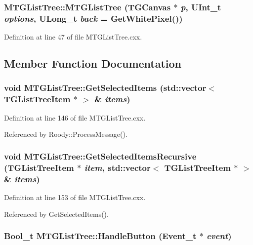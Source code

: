 \subsubsection[{MTGListTree}]{\setlength{\rightskip}{0pt plus 5cm}MTGListTree::MTGListTree (TGCanvas $\ast$ {\em p}, \/  UInt\_\-t {\em options}, \/  ULong\_\-t {\em back} = {\ttfamily GetWhitePixel()})}\label{classMTGListTree_ad0a89f242825cc021a560796533702b4}


Definition at line 47 of file MTGListTree.cxx.

\subsection{Member Function Documentation}
\subsubsection[{GetSelectedItems}]{\setlength{\rightskip}{0pt plus 5cm}void MTGListTree::GetSelectedItems (std::vector$<$ TGListTreeItem $\ast$ $>$ \& {\em items})}\label{classMTGListTree_a959170a63b6fb0a2c17944f6316743ce}


Definition at line 146 of file MTGListTree.cxx.

Referenced by Roody::ProcessMessage().
\subsubsection[{GetSelectedItemsRecursive}]{\setlength{\rightskip}{0pt plus 5cm}void MTGListTree::GetSelectedItemsRecursive (TGListTreeItem $\ast$ {\em item}, \/  std::vector$<$ TGListTreeItem $\ast$ $>$ \& {\em items})}\label{classMTGListTree_ae4574857d80369d1acf9df42ab38d331}


Definition at line 153 of file MTGListTree.cxx.

Referenced by GetSelectedItems().
\subsubsection[{HandleButton}]{\setlength{\rightskip}{0pt plus 5cm}Bool\_\-t MTGListTree::HandleButton (Event\_\-t $\ast$ {\em event})}\label{classMTGListTree_aa653659e11fde3d1675254c0a49416bc}


